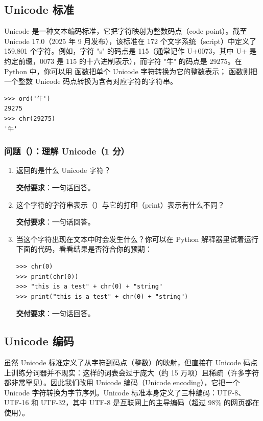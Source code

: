 \subsection{Unicode 标准}

Unicode 是一种文本编码标准，它把字符映射为整数码点（code point）。截至 Unicode 17.0（2025 年 9 月发布），该标准在 172 个文字系统（script）中定义了 159,801 个字符。例如，字符 "s" 的码点是 115（通常记作 U+0073，其中 U+ 是约定前缀，0073 是 115 的十六进制表示），而字符 "牛" 的码点是 29275。在 Python 中，你可以用  函数把单个 Unicode 字符转换为它的整数表示； 函数则把一个整数 Unicode 码点转换为含有对应字符的字符串。

\begin{lstlisting}
>>> ord('牛')
29275
>>> chr(29275)
'牛'
\end{lstlisting}

\subsubsection*{问题（）：理解 Unicode（1 分）}

\begin{enumerate}[label=(\alph*)]
  \item {} 返回的是什么 Unicode 字符？

        \textbf{交付要求}：一句话回答。

  \item 这个字符的字符串表示（）与它的打印（print）表示有什么不同？

        \textbf{交付要求}：一句话回答。

  \item 当这个字符出现在文本中时会发生什么？你可以在 Python 解释器里试着运行下面的代码，看看结果是否符合你的预期：

\begin{lstlisting}
>>> chr(0)
>>> print(chr(0))
>>> "this is a test" + chr(0) + "string"
>>> print("this is a test" + chr(0) + "string")
\end{lstlisting}

        \textbf{交付要求}：一句话回答。
\end{enumerate}

\subsection{Unicode 编码}

虽然 Unicode 标准定义了从字符到码点（整数）的映射，但直接在 Unicode 码点上训练分词器并不现实：这样的词表会过于庞大（约 15 万项）且稀疏（许多字符都非常罕见）。因此我们改用 Unicode 编码（Unicode encoding），它把一个 Unicode 字符转换为字节序列。Unicode 标准本身定义了三种编码：UTF-8、UTF-16 和 UTF-32，其中 UTF-8 是互联网上的主导编码（超过 98\% 的网页都在使用）。

